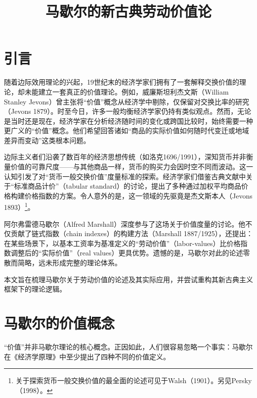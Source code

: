\appendix

\begin{translation}
\label{cha:translation}

\title{马歇尔的新古典劳动价值论}
\maketitle

\tableofcontents

\section{引言}

随着边际效用理论的兴起，19世纪末的经济学家们拥有了一套解释交换价值的理论，却未能建立一套真正的价值理论。例如，威廉斯坦利杰文斯（William Stanley Jevons）曾主张将“价值”概念从经济学中剔除，仅保留对交换比率的研究（Jevons 1879）。时至今日，许多一般均衡经济学家仍持有类似观点。然而，无论是当时还是现在，经济学家在分析经济随时间的变化或跨国比较时，始终需要一种更广义的“价值”概念。他们希望回答诸如“商品的实际价值如何随时代变迁或地域差异而变动”这类根本问题。

边际主义者们沿袭了数百年的经济思想传统（如洛克1696/1991），深知货币并非衡量价值的可靠尺度——与其他商品一样，货币的购买力会因时空不同而波动。这一认知引发了对“货币一般交换价值”度量标准的探索。经济学家们借鉴古典文献中关于“标准商品计价”（tabular standard）的讨论，提出了多种通过加权平均商品价格构建价格指数的方案。令人意外的是，这一领域的先驱竟是杰文斯本人（Jevons 1893）\footnote{关于探索货币一般交换价值的最全面的论述可见于Walsh（1901）。另见Persky（1998）。}。

阿尔弗雷德马歇尔（Alfred Marshall）深度参与了这场关于价值度量的讨论。他不仅贡献了链式指数（chain indexes）的构建方法（Marshall 1887/1925），还提出：在某些场景下，以基本工资率为基准定义的“劳动价值”（labor-values）比价格指数调整后的“实际价值”（real values）更具优势。遗憾的是，马歇尔对此的论述零散而简略，远未形成完整的理论体系。

本文旨在梳理马歇尔关于劳动价值的论述及其实际应用，并尝试重构其新古典主义框架下的理论逻辑。

\section{马歇尔的价值概念}

“价值”并非马歇尔理论的核心概念。正因如此，人们很容易忽略一个事实：马歇尔在《经济学原理》中至少提出了四种不同的价值定义。


\end{translation}
